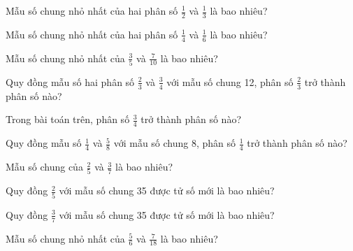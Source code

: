 \begin{ex}
Mẫu số chung nhỏ nhất của hai phân số $\frac{1}{2}$ và $\frac{1}{3}$ là bao nhiêu?
\end{ex}

\begin{ex}
Mẫu số chung nhỏ nhất của hai phân số $\frac{1}{4}$ và $\frac{1}{6}$ là bao nhiêu?
\end{ex}

\begin{ex}
Mẫu số chung nhỏ nhất của $\frac{3}{5}$ và $\frac{7}{10}$ là bao nhiêu?
\end{ex}

\begin{ex}
Quy đồng mẫu số hai phân số $\frac{2}{3}$ và $\frac{3}{4}$ với mẫu số chung 12, phân số $\frac{2}{3}$ trở thành phân số nào?
\end{ex}

\begin{ex}
Trong bài toán trên, phân số $\frac{3}{4}$ trở thành phân số nào?
\end{ex}

\begin{ex}
Quy đồng mẫu số $\frac{1}{4}$ và $\frac{5}{8}$ với mẫu số chung 8, phân số $\frac{1}{4}$ trở thành phân số nào?
\end{ex}

\begin{ex}
Mẫu số chung của $\frac{2}{5}$ và $\frac{3}{7}$ là bao nhiêu?
\end{ex}

\begin{ex}
Quy đồng $\frac{2}{5}$ với mẫu số chung 35 được tử số mới là bao nhiêu?
\end{ex}

\begin{ex}
Quy đồng $\frac{3}{7}$ với mẫu số chung 35 được tử số mới là bao nhiêu?
\end{ex}

\begin{ex}
Mẫu số chung nhỏ nhất của $\frac{5}{6}$ và $\frac{7}{18}$ là bao nhiêu?
\end{ex}

